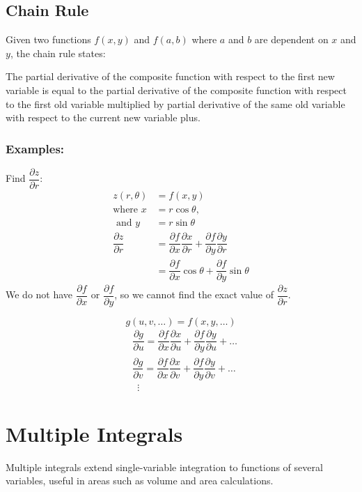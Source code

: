 \documentclass[a4paper,12pt,openany]{book}
\newcommand{\pd}[2]{\dfrac{\partial #1}{\partial #2}}
\begin{document}
\section{Chain Rule}

Given two functions \(f(x, y)\) and \(f(a, b)\) where $a$ and $b$ are dependent on $x$ and $y$, the chain rule states:

The partial derivative of the composite function with respect to the first new variable is equal to the partial derivative of the composite function with respect to the first old variable multiplied by partial derivative of the same old variable with respect to the current new variable plus.

\subsection{Examples:}
Find $\pd{z}{r}$:
\begin{align*}
    z(r,\theta) &= f(x, y)\\
    \text{where } x &= r\cos\theta,\\
    \text{ and } y &= r\sin\theta\\
    \pd{z}{r} &= \pd{f}{x}\pd{x}{r} + \pd{f}{y}\pd{y}{r}\\
    &= \pd{f}{x}\cos\theta + \pd{f}{y}\sin\theta
\end{align*}
We do not have $\pd{f}{x}$ or $\pd{f}{y}$, so we cannot find the exact value of $\pd{z}{r}$.

\[
g(u, v, \ldots) = f(x, y, \ldots)
\]
\begin{align*}
    &\pd{g}{u} = \pd{f}{x}\pd{x}{u} + \pd{f}{y}\pd{y}{u} + \ldots\\
    &\pd{g}{v} = \pd{f}{x}\pd{x}{v} + \pd{f}{y}\pd{y}{v} + \ldots\\
    &\,\,\,\vdots
\end{align*}


\chapter{Multiple Integrals}
Multiple integrals extend single-variable integration to functions of several variables, useful in areas such as volume and area calculations.

\end{document}
